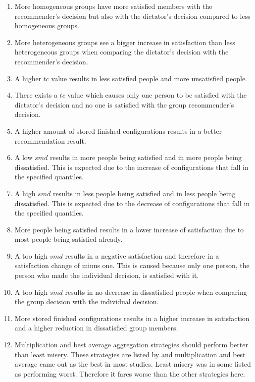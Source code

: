 \begin{enumerate}[font={\bfseries},label={H\arabic*}]
    \item More homogeneous groups have more satisfied members with the recommender's decision but also with the dictator's decision compared to less homogeneous groups.
    \item More heterogeneous groups see a bigger increase in satisfaction than less heterogeneous groups when comparing the dictator's decision with the recommender's decision.
    \item A higher $tc$ value results in less satisfied people and more unsatisfied people.
    \item There exists a $tc$ value which causes only one person to be satisfied with the dictator's decision and no one is satisfied with the group recommender's decision.
    \item A higher amount of stored finished configurations results in a better recommendation result.


    \item \label{hyp:Evaluation:LowSMD} A low $smd$ results in more people being satisfied and in more people being dissatisfied. This is expected due to the increase of configurations that fall in the specified quantiles.
    \item \label{hyp:Evaluation:HighSMD} A high $smd$ results in less people being satisfied and in less people being dissatisfied. This is expected due to the decrease of configurations that fall in the specified quantiles.
    \item \label{hyp:Evaluation:MoreSatisfiedLessIncrease} More people being satisfied results in a lower increase of satisfaction due to most people being satisfied already.
    \item \label{hyp:Evaluation:OnePersonSatisfied} A too high $smd$ results in a negative satisfaction and therefore in a satisfaction change of minus one. This is caused because only one person, the person who made the individual decision, is satisfied with it.
    \item \label{hyp:Evaluation:NoOnedissatisfied} A too high $smd$ results in no decrease in dissatisfied people when comparing the group decision with the individual decision.
    \item \label{hyp:Evaluation:NumberOfStored} More stored finished configurations results in a higher increase in satisfaction and a higher reduction in dissatisfied group members.
    \item \label{hyp:Evaluation:AggregationFunctions} Multiplication and best average aggregation strategies should perform better than least misery. These strategies are listed by \citeauthor{Masthoff2015} \cite[p. 755f]{Masthoff2015} and multiplication and best average came out as the best in most studies. Least misery was in some listed as performing worst. Therefore it fares worse than the other strategies here.
\end{enumerate}


